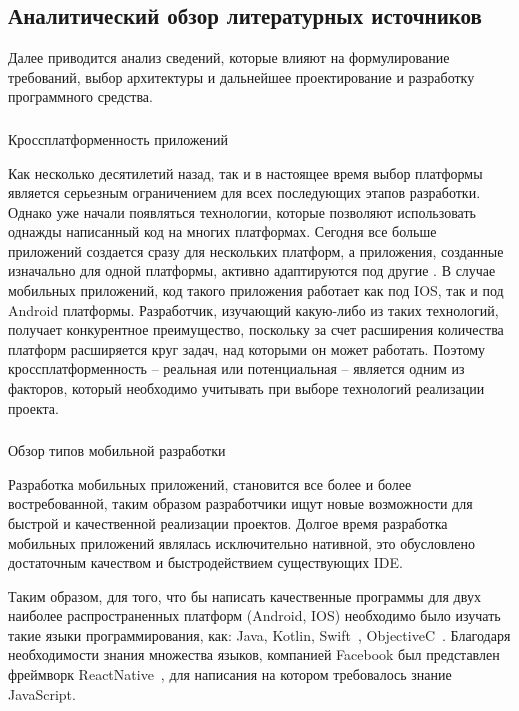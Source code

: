 \subsection{Аналитический обзор литературных источников}
\label{sec:analysis:literature}

Далее приводится анализ сведений, которые влияют на формулирование требований, выбор архитектуры и дальнейшее проектирование и разработку программного средства.

\subsubsection{} Кроссплатформенность приложений
\label{sec:analysis:literature:crossplatform}

Как несколько десятилетий назад, так и в настоящее время выбор платформы является серьезным ограничением для всех последующих этапов разработки. Однако уже начали появляться технологии, которые позволяют использовать однажды написанный код на многих платформах. Сегодня все больше приложений создается сразу для нескольких платформ, а приложения, созданные изначально для одной платформы, активно адаптируются под другие \cite{crossplatform}. В случае мобильных приложений, код такого приложения работает как под IOS, так и под Android платформы. Разработчик, изучающий какую-либо из таких технологий, получает конкурентное преимущество, поскольку за счет расширения количества платформ расширяется круг задач, над которыми он может работать. Поэтому кроссплатформенность -- реальная или потенциальная -- является одним из факторов, который необходимо учитывать при выборе технологий реализации проекта.

\subsubsection{} Обзор типов мобильной разработки
\label{sec:analysis:literature:platforms}

Разработка мобильных приложений, становится все более и более
востребованной, таким образом разработчики ищут новые возможности для
быстрой и качественной реализации проектов. Долгое время разработка
мобильных приложений являлась исключительно нативной, это обусловлено
достаточным качеством и быстродействием существующих IDE.

Таким образом, для того, что бы написать качественные программы для
двух наиболее распространенных платформ (Android, IOS) необходимо было
изучать такие языки программирования, как: Java, Kotlin, Swift~\cite{swift}, ObjectiveC~\cite{objectiveC}. Благодаря необходимости знания множества языков, компанией
Facebook был представлен фреймворк ReactNative~\cite{reactNaitve}, для написания на
котором требовалось знание JavaScript.

